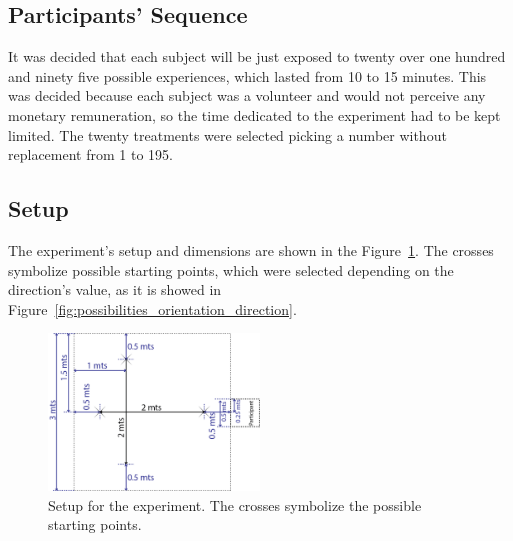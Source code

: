 \subsection{Participants' Sequence}

It was decided that each subject will be just exposed to twenty over one hundred and ninety five possible experiences, which lasted  from 10 to 15 minutes. This was decided because each subject was a volunteer and would not perceive any monetary remuneration, so the time dedicated to the experiment had to be kept limited. The twenty treatments were selected picking a number without replacement from 1 to 195.

\subsection{Setup}

The experiment's setup and dimensions are shown in the Figure~\ref{fig:setup}. The crosses symbolize possible starting points, which were selected depending on the direction's value, as it is showed in Figure~\ref{fig:possibilities_orientation_direction}. 

\begin{figure}
	\centering
	\includegraphics[width=0.50\textwidth]{./Images/ExperimentGeneral.png} 
	\caption{Setup for the experiment. The crosses symbolize the possible starting points.}
	\label{fig:setup}
\end{figure} 